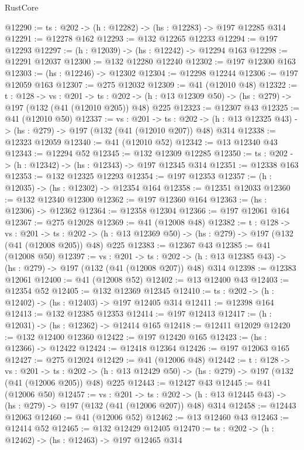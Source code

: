 \begin{lexlean}{RustCore}
\begin{coremodule}
@12290 := {ts : @202} -> (h : @12282) -> (hs : @12283) -> @197 @12285 @314
@12291 := @12278 @162
@12293 := @132 @12265 @12233
@12294 := @197 @12293
@12297 := (h : @12039) -> (hs : @12242) -> @12294 @163
@12298 := @12291 @12037
@12300 := @132 @12280 @12240
@12302 := @197 @12300 @163
@12303 := (hs : @12246) -> @12302
@12304 := @12298 @12244
@12306 := @197 @12059 @163
@12307 := @275 @12032
@12309 := @41 (@12010 @48)
@12322 := {t : @128} ->
  {vs : @201} ->
  {ts : @202} -> (h : @13 @12309 @50) -> (hs : @279) -> @197 (@132 (@41 (@12010 @205)) @48) @225
@12323 := @12307 @43
@12325 := @41 (@12010 @50)
@12337 := {vs : @201} ->
  {ts : @202} -> (h : @13 @12325 @43) -> (hs : @279) -> @197 (@132 (@41 (@12010 @207)) @48) @314
@12338 := @12323 @12059
@12340 := @41 (@12010 @52)
@12342 := @13 @12340 @43
@12343 := @12294 @52
@12345 := @132 @12309 @12285
@12350 := {ts : @202} -> (h : @12342) -> (hs : @12343) -> @197 @12345 @314
@12351 := @12338 @163
@12353 := @132 @12325 @12293
@12354 := @197 @12353
@12357 := (h : @12035) -> (hs : @12302) -> @12354 @164
@12358 := @12351 @12033
@12360 := @132 @12340 @12300
@12362 := @197 @12360 @164
@12363 := (hs : @12306) -> @12362
@12364 := @12358 @12304
@12366 := @197 @12061 @164
@12367 := @275 @12028
@12369 := @41 (@12008 @48)
@12382 := {t : @128} ->
  {vs : @201} ->
  {ts : @202} -> (h : @13 @12369 @50) -> (hs : @279) -> @197 (@132 (@41 (@12008 @205)) @48) @225
@12383 := @12367 @43
@12385 := @41 (@12008 @50)
@12397 := {vs : @201} ->
  {ts : @202} -> (h : @13 @12385 @43) -> (hs : @279) -> @197 (@132 (@41 (@12008 @207)) @48) @314
@12398 := @12383 @12061
@12400 := @41 (@12008 @52)
@12402 := @13 @12400 @43
@12403 := @12354 @52
@12405 := @132 @12369 @12345
@12410 := {ts : @202} -> (h : @12402) -> (hs : @12403) -> @197 @12405 @314
@12411 := @12398 @164
@12413 := @132 @12385 @12353
@12414 := @197 @12413
@12417 := (h : @12031) -> (hs : @12362) -> @12414 @165
@12418 := @12411 @12029
@12420 := @132 @12400 @12360
@12422 := @197 @12420 @165
@12423 := (hs : @12366) -> @12422
@12424 := @12418 @12364
@12426 := @197 @12063 @165
@12427 := @275 @12024
@12429 := @41 (@12006 @48)
@12442 := {t : @128} ->
  {vs : @201} ->
  {ts : @202} -> (h : @13 @12429 @50) -> (hs : @279) -> @197 (@132 (@41 (@12006 @205)) @48) @225
@12443 := @12427 @43
@12445 := @41 (@12006 @50)
@12457 := {vs : @201} ->
  {ts : @202} -> (h : @13 @12445 @43) -> (hs : @279) -> @197 (@132 (@41 (@12006 @207)) @48) @314
@12458 := @12443 @12063
@12460 := @41 (@12006 @52)
@12462 := @13 @12460 @43
@12463 := @12414 @52
@12465 := @132 @12429 @12405
@12470 := {ts : @202} -> (h : @12462) -> (hs : @12463) -> @197 @12465 @314

\end{coremodule}
\end{lexlean}
